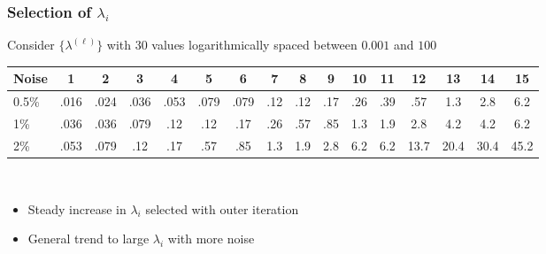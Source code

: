 \documentclass[12pt,t,xcolor=dvipsnames]{beamer}
\newcommand{\alerta}[1]{{\usebeamercolor[fg]{frametitle} #1}}
\begin{document}
\begin{frame}
  \frametitle{Selection of $\lambda_i$}

  Consider $\{\lambda^{(\ell)}\}$ with 30 values logarithmically spaced between
  $0.001$ and $100$ \\[12pt]

  \hspace*{-1cm}
  \setlength\tabcolsep{1.5pt}
  \begin{tabular}{l|ccccc|ccccc|ccccc}
    Noise & 1 & 2 & 3 & 4 & 5 & 6 & 7 & 8 & 9 & 10 & 11 & 12 & 13 & 14
    & 15 \\
    \hline
    0.5\% & .016 &  .024 &  .036 &  .053 &  .079 &    .079 &    .12 &
    .12 &    .17 &    .26 &    .39 & .57 &    \alerta{1.3} &    \alerta{2.8} &    \alerta{6.2}\\
    1\% & .036 &   .036  &  .079 &   .12 &    .12 &    .17 &
    .26 &    .57 &    \alerta{.85} &    \alerta{1.3} &    \alerta{1.9} & \alerta{2.8} &   \alerta{4.2} &
    \alerta{4.2} &    \alerta{6.2}\\
    2\% & .053 &    .079 &   .12 &   .17 &    .57 &    \alerta{.85} &    \alerta{1.3} &
    \alerta{1.9} &    \alerta{2.8} &    \alerta{6.2} &    \alerta{6.2} & \alerta{13.7} &  \alerta{20.4} &   \alert{30.4} &   \alert{45.2}\\
   \end{tabular}

  \ \\[12pt]
  \begin{itemize}
  \item Steady increase in $\lambda_i$ selected with outer iteration
  \item General trend to large $\lambda_i$ with more noise
  \end{itemize}

\end{frame}
\end{document}
